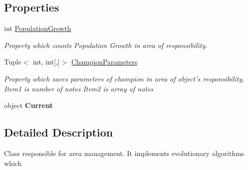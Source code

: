 \subsection*{Properties}
\begin{DoxyCompactItemize}
\item 
int \hyperlink{class_music_population_1_1_area_manager_aefd6bf2d6e3330f4648b2e4f1f43bec9}{Population\+Growth}
\begin{DoxyCompactList}\small\item\em Property which counts Population Growth in area of responsibility. \end{DoxyCompactList}\item 
Tuple$<$ int, int\mbox{[},\mbox{]}$>$ \hyperlink{class_music_population_1_1_area_manager_a86c18c633b2331918caed26574120933}{Champion\+Parameters}
\begin{DoxyCompactList}\small\item\em Property which saves parameters of champion in area of object's responsibility. Item1 is number of notes Item2 is array of notes \end{DoxyCompactList}\item 
\hypertarget{class_music_population_1_1_area_manager_ab12ffa91c850c5a510f248e87c2cfd63}{object {\bfseries Current}}\label{class_music_population_1_1_area_manager_ab12ffa91c850c5a510f248e87c2cfd63}

\end{DoxyCompactItemize}


\subsection{Detailed Description}
Class responsible for area management. It implements evolutionary algorithms which 



